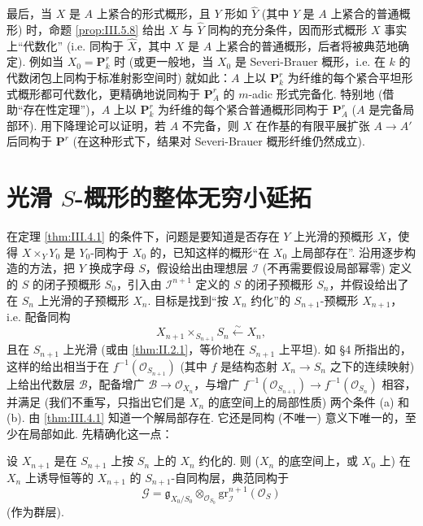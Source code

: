 最后，当 $X$ 是 $A$ 上紧合的形式概形，且 $Y$ 形如 $\widehat{Y}$ (其中 $Y$ 是 $A$ 上紧合的普通概形) 时，命题 \ref{prop:III.5.8} 给出 $X$ 与 $\widehat{Y}$ 同构的充分条件，因而形式概形 $X$ 事实上``代数化'' (i.e. 同构于 $\widehat{X}$，其中 $X$ 是 $A$ 上紧合的普通概形，后者将被典范地确定). 例如当 $X_0 = \mathbf{P}_k^r$ 时 (或更一般地，当 $X_0$ 是 Severi-Brauer 概形，i.e. 在 $k$ 的代数闭包上同构于标准射影空间时) 就如此：$A$ 上以 $\mathbf{P}_k^r$ 为纤维的每个紧合平坦形式概形都可代数化，更精确地说同构于 $\mathbf{P}_A^r$ 的 $m$-adic 形式完备化. 特别地 (借助``存在性定理'')，$A$ 上以 $\mathbf{P}_k^r$ 为纤维的每个紧合普通概形同构于 $\mathbf{P}_A^r$ ($A$ 是完备局部环). 用下降理论可以证明，若 $A$ 不完备，则 $X$ 在作基的有限平展扩张 $A \to A'$ 后同构于 $\mathbf{P}^r$ (在这种形式下，结果对 Severi-Brauer 概形纤维仍然成立).

\section{光滑 \texorpdfstring{$S$-概形}{S-概形}的整体无穷小延拓}

在定理 \ref{thm:III.4.1} 的条件下，问题是要知道是否存在 $Y$ 上光滑的预概形 $X$，使得 $X \times_Y Y_0$ 是 $Y_0$-同构于 $X_0$ 的，已知这样的概形``在 $X_0$ 上局部存在''. 沿用逐步构造的方法，把 $Y$ 换成字母 $S$，假设给出由理想层 $\mathcal{I}$ (不再需要假设局部幂零) 定义的 $S$ 的闭子预概形 $S_0$，引入由 $\mathcal{I}^{n+1}$ 定义的 $S$ 的闭子预概形 $S_n$，并假设给出了在 $S_n$ 上光滑的子预概形 $X_n$. 目标是找到``按 $X_n$ 约化''的 $S_{n+1}$-预概形 $X_{n+1}$，i.e. 配备同构
\[
X_{n+1} \times_{S_{n+1}} S_n \stackrel{\sim}{\longleftarrow} X_n,
\]
且在 $S_{n+1}$ 上光滑 (或由 \ref{thm:II.2.1}，等价地在 $S_{n+1}$ 上平坦). 如 §4 所指出的，这样的给出相当于在 $f^{-1}(\mathcal{O}_{S_{n+1}})$ (其中 $f$ 是结构态射 $X_n \to S_n$ 之下的连续映射) 上给出代数层 $\mathcal{B}$，配备增广 $\mathcal{B} \to \mathcal{O}_{X_n}$，与增广 $f^{-1}(\mathcal{O}_{S_{n+1}}) \to f^{-1}(\mathcal{O}_{S_n})$ 相容，并满足 (我们不重写，只指出它们是 $X_n$ 的底空间上的局部性质) 两个条件 (a) 和 (b). 由 \ref{thm:III.4.1} 知道一个解局部存在. 它还是同构 (不唯一) 意义下唯一的，至少在局部如此. 先精确化这一点：

\begin{proposition}\label{prop:III.6.1}
设 $X_{n+1}$ 是在 $S_{n+1}$ 上按 $S_n$ 上的 $X_n$ 约化的. 则 ($X_n$ 的底空间上，或 $X_0$ 上) 在 $X_n$ 上诱导恒等的 $X_{n+1}$ 的 $S_{n+1}$-自同构层，典范同构于
\[
\mathcal{G} = \mathfrak{g}_{X_0/S_0} \otimes_{\mathcal{O}_{S_0}} \mathrm{gr}_{\mathcal{I}}^{n+1}(\mathcal{O}_S)
\]
(作为群层).
\end{proposition}


